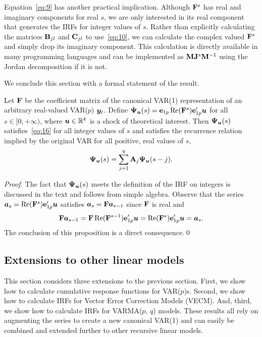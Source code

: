 \documentclass[AER,reviewmode]{tex/AEA}
\begin{document}
Equation~\eqref{eq:9} has another practical implication. Although
$\mathbf{F}^s$ has real and imaginary components for real $s$, we are only
interested in its real component that generates the IRFs for integer
values of $s$. Rather than explicitly calculating the matrices
$\mathbf{B}_{jl}$ and $\mathbf{C}_{jl}$ to use~\eqref{eq:10}, we can calculate the
complex valued $\mathbf{F}^s$ and simply drop its imaginary component. This
calculation is directly available in many programming languages and
can be implemented as $\mathbf{M} \mathbf{J}^s \mathbf{M}^{-1}$ using the Jordan decomposition if
it is not.

We conclude this section with a formal statement of the result.

\begin{proposition}
  \label{P1}
  Let $\mathbf{F}$ be the coefficient matrix of the canonical VAR(1)
  representation of an arbitrary real-valued VAR($p$) $\bm{y}_t$. Define
  $\bm{\Psi}_{\bm{u}}(s) = \mathbf{e}_{1p} \operatorname{Re}(\mathbf{F}^s) \mathbf{e}_{1p}' \bm{u}$ for all
  $s \in [0,+\infty)$, where $\bm{u} \in \mathbb{R}^k$ is a shock of theoretical
  interest. Then $\bm{\Psi}_{\bm{u}}(s)$ satisfies~\eqref{eq:16} for all
  integer values of $s$ and satisfies the recurrence relation implied
  by the original VAR for all positive, real values of $s$,
  \begin{equation}
    \label{eq:11}
    \bm{\Psi}_{\bm{u}}(s) = \sum_{j=1}^q \mathbf{A}_j \bm{\Psi}_{\bm{u}}(s-j).
  \end{equation}
\end{proposition}
\begin{proof}
  The fact that $\bm{\Psi}_{\bm{u}}(s)$ meets the definition of the IRF on
  integers is discussed in the text and follows from simple
  algebra. Observe that the series $\bm{a}_s = \operatorname{Re}(\mathbf{F}^s) \mathbf{e}_{1p}'\bm{u}$ satisfies
  $\bm{a}_s = \mathbf{F} \bm{a}_{s-1}$ since $\mathbf{F}$ is real and
  \[
    \mathbf{F} \bm{a}_{s-1} = \mathbf{F} \operatorname{Re}(\mathbf{F}^{s-1}) \mathbf{e}_{1p}'\bm{u}
    = \operatorname{Re}(\mathbf{F}^s) \mathbf{e}_{1p}'\bm{u}
    = \bm{a}_s.
  \]
  The conclusion of this proposition is a direct consequence.\qed
\end{proof}

\subsection[Finite-order linear models]{Extensions to other linear models}
\label{S2.3}

This section considers three extensions to the previous section.
First, we show how to calculate cumulative response functions for
VAR($p$)s. Second, we show how to calculate IRFs for Vector Error
Correction Models (VECM). And, third, we show how to calculate IRFs
for VARMA($p$, $q$) models. These results all rely on augmenting the
series to create a new canonical VAR(1) and can easily be combined
and extended further to other recursive linear models.
\end{document}
